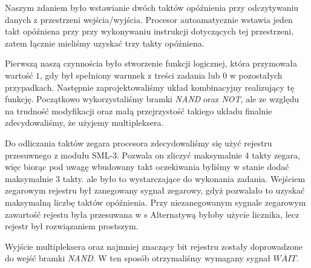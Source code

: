 \documentclass[fleqn]{article}
\begin{document}
Naszym zdaniem było wstawianie dwóch taktów opóźnienia przy odczytywaniu danych z przestrzeni wejścia/wyjścia. Procesor autoamatycznie wstawia jeden takt opóźniena przy przy wykonywaniu instrukcji dotyczących tej przestrzeni, zatem łącznie mieliśmy uzyskać trzy takty opóźniena.

Pierwszą naszą czynnościa było stworzenie funkcji logicznej, która przymowała wartość $1$, gdy był spełniony warunek z treści zadania lub $0$ w pozostałych przypadkach. Następnie zaprojektowaliśmy układ kombinacyjny realizujący tę funkcję. Początkowo wykorzystaliśmy bramki \textit{NAND} oraz \textit{NOT}, ale ze względu na trudność modyfikacji oraz małą przejrzystość takiego układu finalnie zdecydowaliśmy, że użyjemy multipleksera.

Do odliczania taktów zegara procesora zdecydowaliśmy się użyć rejestru przesuwnego z modułu SML-3. Pozwala on zliczyć maksymalnie 4 takty zegara, więc biorąc pod uwagę wbudowany takt oczekiwania byliśmy w stanie dodać maksymalnie 3 takty. ale było to wystarczające do wykonania zadania. Wejściem zegarowym rejestru był zanegowany sygnał zegarowy, gdyż pozwalało to uzyskać maksymalną liczbę taktów opóźnienia. Przy niezanegowanym sygnale zegarowym zawartość rejestu była przesuwana w s Alternatywą byłoby użycie licznika, lecz rejestr był rozwiązaniem prostszym.

Wyjście multipleksera oraz najmniej znaczący bit rejestru zostały doprowadzone do wejść bramki \textit{NAND}. W ten sposób otrzymaliśmy wymagany sygnał $\overline{WAIT}$.
\end{document}
